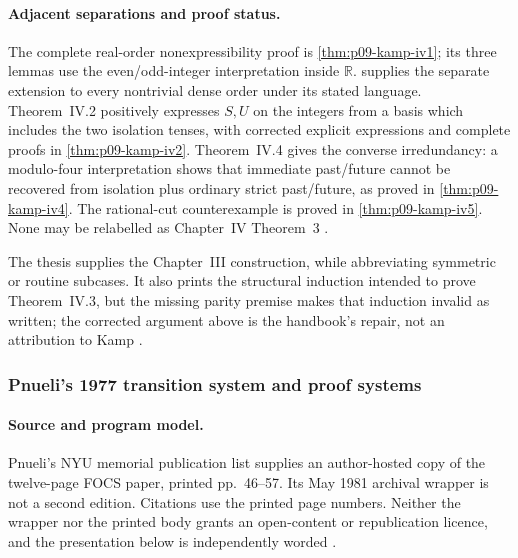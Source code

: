 


\paragraph{Adjacent separations and proof status.}
The complete real-order nonexpressibility proof is
\cref{thm:p09-kamp-iv1}; its three lemmas use the even/odd-integer
interpretation inside \(\mathbb R\).
 supplies the separate
extension to every nontrivial dense order under its stated language.
Theorem~IV.2 positively expresses \(S,U\) on the integers from a basis which
includes the two isolation tenses, with corrected explicit expressions and
complete proofs in \cref{thm:p09-kamp-iv2}.
Theorem~IV.4 gives the converse
irredundancy: a modulo-four interpretation shows that immediate past/future
cannot be recovered from isolation plus ordinary strict past/future,
as proved in \cref{thm:p09-kamp-iv4}.
The rational-cut counterexample is proved in \cref{thm:p09-kamp-iv5}.
None may
be relabelled as Chapter~IV Theorem~3
\cite[ch.~IV, pp.~95--112]{Kamp1968}.

The thesis supplies the Chapter~III construction, while abbreviating symmetric
or routine subcases.  It also prints the structural induction intended to
prove Theorem~IV.3, but the missing parity premise makes that induction
invalid as written; the corrected argument above is the handbook's repair,
not an attribution to Kamp
\cite[ch.~III, pp.~39--94; ch.~IV, pp.~105--108]{Kamp1968}.

\subsubsection{Pnueli's 1977 transition system and proof systems}

\paragraph{Source and program model.}
Pnueli's NYU memorial publication list supplies an author-hosted copy of the
twelve-page FOCS paper, printed pp.~46--57.  Its May 1981 archival wrapper is
not a second edition.  Citations use the printed page numbers.  Neither the
wrapper nor the printed body grants an open-content or republication licence,
and the presentation below is independently worded \cite{Pnueli1977}.

